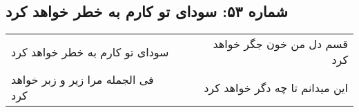 \begin{center}
\section*{شماره ۵۳: سودای تو کارم به خطر خواهد کرد}
\label{sec:053}
\begin{longtable}{l p{0.5cm} r}
سودای تو کارم به خطر خواهد کرد
&&
قسم دل من خون جگر خواهد کرد
\\
فی الجمله مرا زیر و زبر خواهد کرد
&&
این میدانم تا چه دگر خواهد کرد
\\
\end{longtable}
\end{center}

